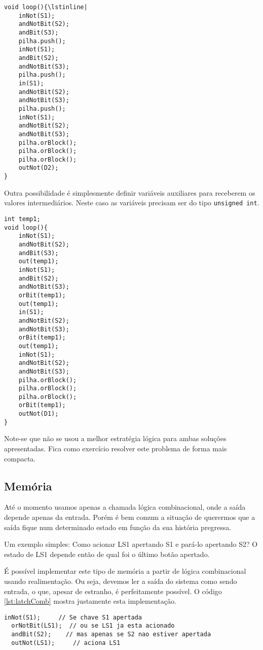 \begin{lstlisting}[caption=Solução do voto majoritário com uso de pilha., label=lst:majPilha]
void loop(){\lstinline|
	inNot(S1);
	andNotBit(S2);
	andBit(S3);
	pilha.push();
	inNot(S1);
	andBit(S2);
	andNotBit(S3);
	pilha.push();
	in(S1);
	andNotBit(S2);
	andNotBit(S3);
	pilha.push();
	inNot(S1);
	andNotBit(S2);
	andNotBit(S3);
	pilha.orBlock();
	pilha.orBlock();
	pilha.orBlock();
	outNot(D2);
}
\end{lstlisting}

Outra possibilidade é simplesmente definir variáveis auxiliares para receberem os valores intermediários. Neste caso as variáveis precisam ser do tipo \lstinline|unsigned int|.
\begin{lstlisting}[caption=Solução do voto majoritário com uso de variável., label=lst:majVar]
int temp1;
void loop(){
	inNot(S1);
	andNotBit(S2);
	andBit(S3);
	out(temp1);
	inNot(S1);
	andBit(S2);
	andNotBit(S3);
	orBit(temp1);
	out(temp1);
	in(S1);
	andNotBit(S2);
	andNotBit(S3);
	orBit(temp1);
	out(temp1);
	inNot(S1);
	andNotBit(S2);
	andNotBit(S3);
	pilha.orBlock();
	pilha.orBlock();
	pilha.orBlock();
	orBit(temp1);
	outNot(D1);
}
\end{lstlisting}

Note-se que não se usou a melhor estratégia lógica para ambas soluções apresentadas. Fica como exercício resolver este problema de forma mais compacta.
\subsection{Memória}

Até o momento usamos apenas a chamada lógica combinacional, onde a saída depende apenas da entrada. Porém é bem comum a situação de querermos que a saída fique num determinado estado em função da sua história pregressa. 

Um exemplo simples: Como acionar LS1 apertando S1 e pará-lo apertando S2? O estado de LS1 depende então de qual foi o último botão apertado.

É possível implementar este tipo de memória a partir de lógica combinacional usando realimentação. Ou seja, devemos ler a saída do sistema como sendo entrada, o que, apesar de estranho, é perfeitamente possível. O código \ref{lst:latchComb} mostra justamente esta implementação.
\begin{lstlisting}[caption=Implementação de latch com lógica combinacional., label=lst:latchComb]
  inNot(S1);     // Se chave S1 apertada
  orNotBit(LS1);  // ou se LS1 ja esta acionado
  andBit(S2);    // mas apenas se S2 nao estiver apertada
  outNot(LS1);     // aciona LS1
\end{lstlisting}


